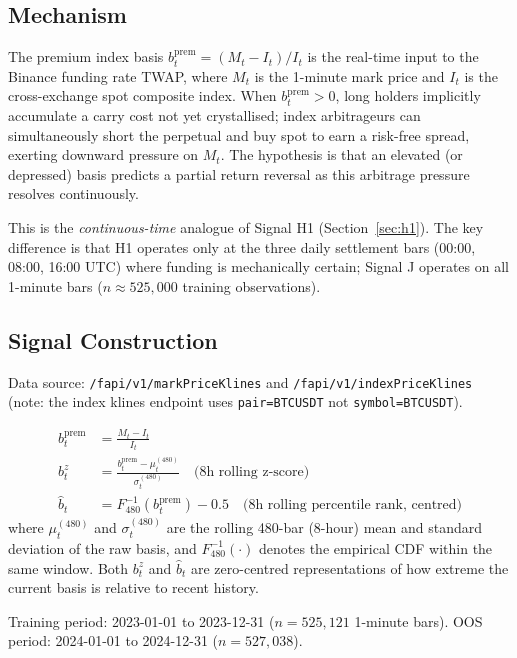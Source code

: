 \documentclass[12pt, a4paper]{article}
\theoremstyle{definition}
\begin{document}
\subsection{Mechanism}

The premium index basis $b^{\text{prem}}_t = (M_t - I_t)/I_t$ is the
real-time input to the Binance funding rate TWAP, where $M_t$ is the 1-minute
mark price and $I_t$ is the cross-exchange spot composite index.  When
$b^{\text{prem}}_t > 0$, long holders implicitly accumulate a carry cost not
yet crystallised; index arbitrageurs can simultaneously short the perpetual
and buy spot to earn a risk-free spread, exerting downward pressure on $M_t$.
The hypothesis is that an elevated (or depressed) basis predicts a partial
return reversal as this arbitrage pressure resolves continuously.

This is the \emph{continuous-time} analogue of Signal H1 (Section~\ref{sec:h1}).
The key difference is that H1 operates only at the three daily settlement bars
(00:00, 08:00, 16:00 UTC) where funding is mechanically certain; Signal J
operates on all 1-minute bars ($n \approx 525{,}000$ training observations).

\subsection{Signal Construction}

Data source: \texttt{/fapi/v1/markPriceKlines} and
\texttt{/fapi/v1/indexPriceKlines} (note: the index klines endpoint uses
\texttt{pair=BTCUSDT} not \texttt{symbol=BTCUSDT}).

\begin{align}
  b^{\text{prem}}_t &= \frac{M_t - I_t}{I_t} \\[4pt]
  b^z_t &= \frac{b^{\text{prem}}_t - \mu^{(480)}_t}{\sigma^{(480)}_t}
  \quad\text{(8h rolling z-score)} \\[4pt]
  \hat{b}_t &= F_{480}^{-1}(b^{\text{prem}}_t) - 0.5
  \quad\text{(8h rolling percentile rank, centred)}
\end{align}
where $\mu^{(480)}_t$ and $\sigma^{(480)}_t$ are the rolling 480-bar
(8-hour) mean and standard deviation of the raw basis, and
$F_{480}^{-1}(\cdot)$ denotes the empirical CDF within the same window.
Both $b^z_t$ and $\hat{b}_t$ are zero-centred representations of how
extreme the current basis is relative to recent history.

Training period: 2023-01-01 to 2023-12-31 ($n = 525{,}121$ 1-minute bars).
OOS period: 2024-01-01 to 2024-12-31 ($n = 527{,}038$).
\end{document}
